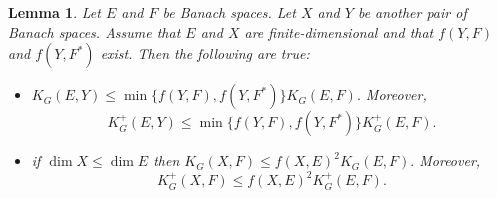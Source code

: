 \documentclass[a4paper,oneside,11pt, reqno]{amsart}
\numberwithin{equation}{section}
\newtheorem{lemma}[theorem]{Lemma}
\theoremstyle{plain}
\begin{document}
\begin{lemma}\label{KG and Subspaces}
Let $E$ and $F$ be Banach spaces. Let $X$ and $Y$ be another pair of Banach spaces. Assume that $E$ and $X$ are finite-dimensional 
and that $f(Y,F)$ and $f(Y,F^*)$ exist. 
Then the following are true:
\begin{itemize}
 \item[(i)] 
$K_G(E,Y)\leqslant \min\{f(Y,F), f(Y,F^*)\}K_G(E,F).$ Moreover,
\[K_G^{+}(E,Y)\leqslant \min\{f(Y,F), f(Y,F^*)\}K_G^{+}(E,F).\]
 \item[(ii)] 
 if $\dim X\leqslant\dim E$ then 
 $K_G(X,F)\leqslant {f}(X,E)^2 K_G(E,F).$ Moreover,  \[K_G^{+}(X,F)\leqslant {f}(X,E)^2 K_G^{+}(E,F).\]
\end{itemize}
\end{lemma}
\end{document}

